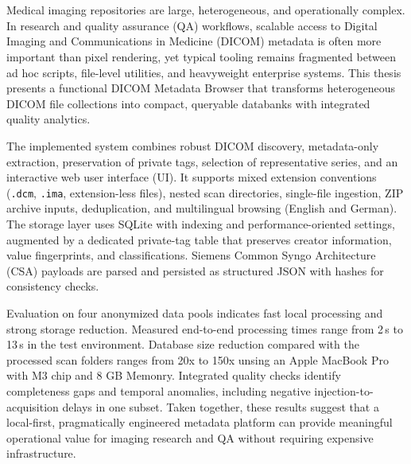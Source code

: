 \chapter{\abstractname}
Medical imaging repositories are large, heterogeneous, and operationally complex. In research and quality assurance (QA) workflows, scalable access to Digital Imaging and Communications in Medicine (DICOM) metadata is often more important than pixel rendering, yet typical tooling remains fragmented between ad hoc scripts, file-level utilities, and heavyweight enterprise systems. This thesis presents a functional DICOM Metadata Browser that transforms heterogeneous DICOM file collections into compact, queryable databanks with integrated quality analytics.

The implemented system combines robust DICOM discovery, metadata-only extraction, preservation of private tags, selection of representative series, and an interactive web user interface (UI). It supports mixed extension conventions (\texttt{.dcm}, \texttt{.ima}, extension-less files), nested scan directories, single-file ingestion, ZIP archive inputs, deduplication, and multilingual browsing (English and German). The storage layer uses SQLite with indexing and performance-oriented settings, augmented by a dedicated private-tag table that preserves creator information, value fingerprints, and classifications. Siemens Common Syngo Architecture (CSA) payloads are parsed and persisted as structured JSON with hashes for consistency checks.

Evaluation on four anonymized data pools indicates fast local processing and strong storage reduction. Measured end-to-end processing times range from 2\,s to 13\,s in the test environment. Database size reduction compared with the processed scan folders ranges from 20x to 150x unsing an Apple MacBook Pro with M3 chip and 8 GB Memonry. Integrated quality checks identify completeness gaps and temporal anomalies, including negative injection-to-acquisition delays in one subset. Taken together, these results suggest that a local-first, pragmatically engineered metadata platform can provide meaningful operational value for imaging research and QA without requiring expensive infrastructure. 
